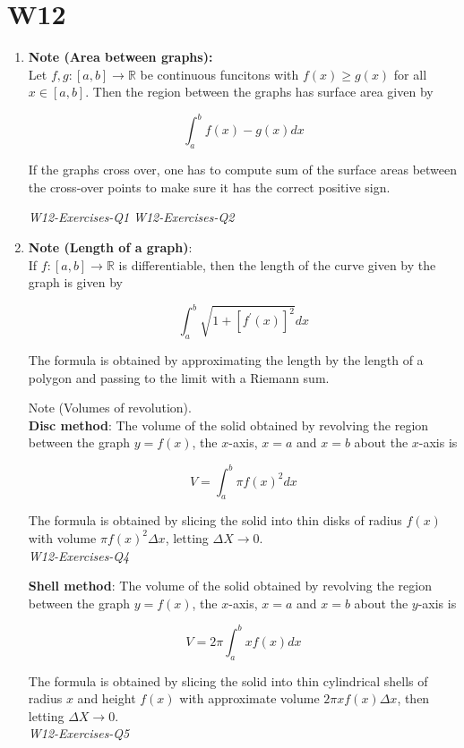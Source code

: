 \documentclass[10pt]{article}
\begin{document}
\section{W12}
\begin{enumerate}
\item \textbf{Note (Area between graphs):}\\
Let $f, g:[a, b] \rightarrow \mathbb{R}$ be continuous funcitons with $f(x) \geq g(x)$ for all $x \in[a, b]$. Then the region between the graphs has surface area given by

$$
\int_{a}^{b} f(x)-g(x) d x
$$

If the graphs cross over, one has to compute sum of the surface areas between the cross-over points to make sure it has the correct positive sign.

\textit{W12-Exercises-Q1}
\textit{W12-Exercises-Q2}


\item \textbf{Note (Length of a graph)}:\\
If $f:[a, b] \rightarrow \mathbb{R}$ is differentiable, then the length of the curve given by the graph is given by

$$
\int_{a}^{b} \sqrt{1+\left[f^{\prime}(x)\right]^{2}} d x
$$

The formula is obtained by approximating the length by the length of a polygon and passing to the limit with a Riemann sum.

Note (Volumes of revolution).\\
\textbf{Disc method}: The volume of the solid obtained by revolving the region between the graph $y=f(x)$, the $x$-axis, $x=a$ and $x=b$ about the $x$-axis is

$$
V=\int_{a}^{b} \pi f(x)^{2} d x
$$

The formula is obtained by slicing the solid into thin disks of radius $f(x)$ with volume $\pi f(x)^{2} \Delta x$, letting $\Delta X \rightarrow 0$.\\
\textit{W12-Exercises-Q4}

\newpage

\textbf{Shell method}: The volume of the solid obtained by revolving the region between the graph $y=f(x)$, the $x$-axis, $x=a$ and $x=b$ about the $y$-axis is

$$
V=2 \pi \int_{a}^{b} x f(x) d x
$$

The formula is obtained by slicing the solid into thin cylindrical shells of radius $x$ and height $f(x)$ with approximate volume $2 \pi x f(x) \Delta x$, then letting $\Delta X \rightarrow 0$.\\
\textit{W12-Exercises-Q5}

\end{enumerate}
\end{document}
